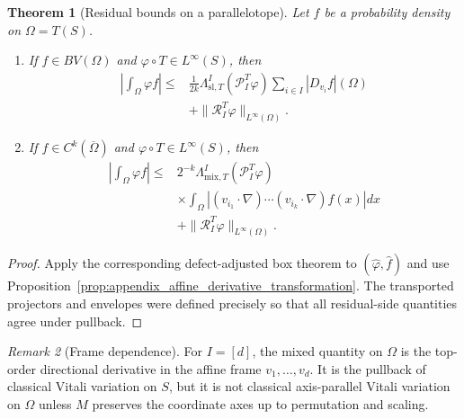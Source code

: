 \documentclass[11pt,letterpaper]{article}
\newtheorem{theorem}{Theorem}[section]
\theoremstyle{definition}
\theoremstyle{remark}
\newtheorem{remark}[theorem]{Remark}
\begin{document}
\begin{theorem}[Residual bounds on a parallelotope]
\label{thm:appendix_parallelotope_bounds}
Let $f$ be a probability density on $\Omega=T(S)$.

\begin{enumerate}
\item[\emph{(i)}] If $f\in BV(\Omega)$ and
$\varphi\circ T\in L^\infty(S)$, then
\begin{equation}
\label{eq:appendix_parallelotope_tv_defect_bound}
\begin{aligned}
\left|\int_\Omega\varphi f\right|
\le{}&
\frac1{2k}
\Lambda_{\mathrm{sl},T}^I(\mathcal P_I^T\varphi)
\sum_{i\in I}|D_{v_i}f|(\Omega)
\\
&+
\|\mathcal R_I^T\varphi\|_{L^\infty(\Omega)}.
\end{aligned}
\end{equation}

\item[\emph{(ii)}] If $f\in C^k(\overline\Omega)$ and
$\varphi\circ T\in L^\infty(S)$, then
\begin{equation}
\label{eq:appendix_parallelotope_mixed_defect_bound}
\begin{aligned}
\left|\int_\Omega\varphi f\right|
\le{}&
2^{-k}
\Lambda_{\mathrm{mix},T}^I(\mathcal P_I^T\varphi)
\\
&\times
\int_\Omega
\left|
(v_{i_1}\cdot\nabla)\cdots(v_{i_k}\cdot\nabla)f(x)
\right|dx
\\
&+
\|\mathcal R_I^T\varphi\|_{L^\infty(\Omega)}.
\end{aligned}
\end{equation}
\end{enumerate}
\end{theorem}

\begin{proof}
Apply the corresponding defect-adjusted box theorem to
$(\widehat\varphi,\widehat f)$ and use
Proposition~\ref{prop:appendix_affine_derivative_transformation}. The
transported projectors and envelopes were defined precisely so that all
residual-side quantities agree under pullback.
\end{proof}

\begin{remark}[Frame dependence]
\label{rem:appendix_affine_vitali_interpretation}
For $I=[d]$, the mixed quantity on $\Omega$ is the top-order directional
derivative in the affine frame $v_1,\ldots,v_d$. It is the pullback of
classical Vitali variation on $S$, but it is not classical axis-parallel
Vitali variation on $\Omega$ unless $M$ preserves the coordinate axes up to
permutation and scaling.
\end{remark}
\end{document}
